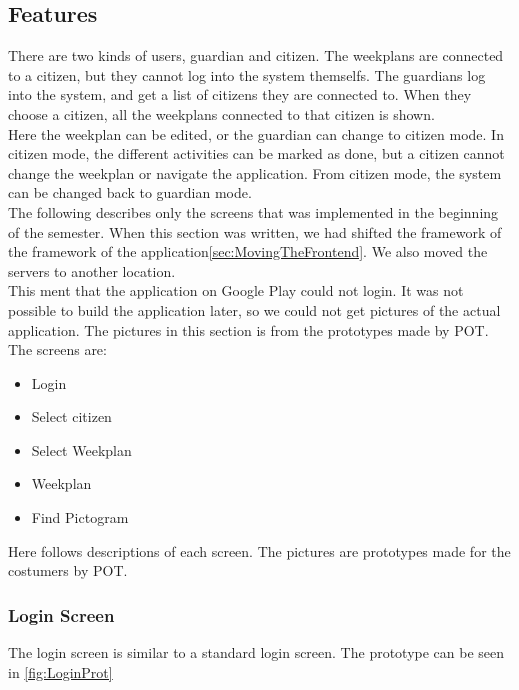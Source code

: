 \subsection{Features}
There are two kinds of users, guardian and citizen. The weekplans are connected to a citizen, but they cannot log into the system themselfs. The guardians log into the system, and get a list of citizens they are connected to. When they choose a citizen, all the weekplans connected to that citizen is shown.\\
Here the weekplan can be edited, or the guardian can change to citizen mode. In citizen mode, the different activities can be marked as done, but a citizen cannot change the weekplan or navigate the application. From citizen mode, the system can be changed back to guardian mode.\\
The following describes only the screens that was implemented in the beginning of the semester. When this section was written, we had shifted the framework of the framework of the application\ref{sec:MovingTheFrontend}. We also moved the servers to another location.\\
This ment that the application on Google Play could not login. It was not possible to build the application later, so we could not get pictures of the actual application. The pictures in this section is from the prototypes made by \gls{POT}.\\ 

The screens are:
\begin{itemize}
    \item Login
    \item Select citizen 
    \item Select Weekplan 
    \item Weekplan
    \item Find Pictogram
\end{itemize}

Here follows descriptions of each screen. The pictures are prototypes made for the costumers by \gls{POT}. 

\subsubsection*{Login Screen}
The login screen is similar to a standard login screen. The prototype can be seen in \ref{fig:LoginProt}

